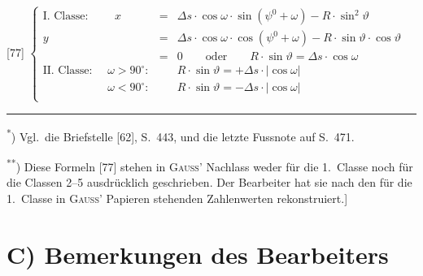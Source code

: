 \documentclass[12pt,a4paper]{article}
\theoremstyle{plain}
\theoremstyle{definition}
\theoremstyle{remark}
\begin{document}
\begin{footnotesize}
\begin{center}
[77] $\left\{\begin{array}{rcl}
\text{I.~Classe: }\quad\quad x & = & \Delta s\cdot\cos\omega\cdot\sin(\psi^{0} + \omega) - R\cdot\sin^{2}\vartheta\\
y & = & \Delta s\cdot\cos\omega\cdot\cos(\psi^{0} + \omega) - R\cdot\sin\vartheta\cdot\cos\vartheta \\
& = & 0\quad\quad\text{oder}\quad\quad R\cdot\sin\vartheta = \Delta s\cdot\cos\omega\\[8pt]
\text{II.~Classe: }\quad \omega > 90^{\circ}: & & R\cdot\sin\vartheta = +\Delta s\cdot|\cos\omega|\\
\phantom{\text{II.~Classe: }}\quad \omega < 90^{\circ}: & & R\cdot\sin\vartheta = -\Delta s\cdot|\cos\omega|\\
\end{array}\right.$
\end{center}
\end{footnotesize}

\medskip
\noindent\rule{\textwidth}{0.4pt}
\begin{footnotesize}
\textsuperscript{*}) Vgl.~die Briefstelle [62], S.~443, und die letzte Fussnote auf S.~471.

\textsuperscript{**}) Diese Formeln [77] stehen in \textsc{Gau\ss'} Nachlass weder f\"ur die 1.~Classe
noch f\"ur die Classen 2--5 ausdr\"ucklich geschrieben. Der Bearbeiter hat sie nach
den f\"ur die 1.~Classe in \textsc{Gau\ss'} Papieren stehenden Zahlenwerten
rekonstruiert.]
\end{footnotesize}


\newpage
\section*{C) Bemerkungen des Bearbeiters}
\end{document}
